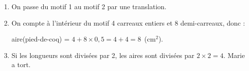 
\medskip

%
%
%
\begin{enumerate}
\item %
On passe du motif 1 au motif 2 par une translation.
\item %

On compte à l'intérieur du motif 4 carreaux entiers et 8 demi-carreaux, donc : 

aire(pied-de-coq) =  $ 4 + 8 \times 0,5  = 4 + 4 = 8$~(cm$^2$).
\item  %

Si les longueurs sont divisées par 2, les aires sont divisées par $2 \times 2 = 4$. Marie a tort.
\end{enumerate}

\vspace{0,5cm}

